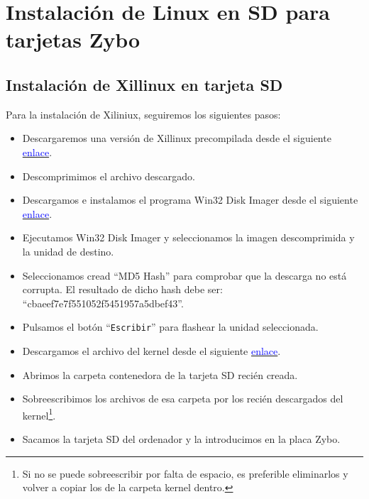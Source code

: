 \section{Instalación de Linux en SD para tarjetas Zybo}
\subsection{Instalación de Xillinux en tarjeta SD}
Para la instalación de Xiliniux, seguiremos los siguientes pasos:
\begin{itemize}
	\item Descargaremos una versión de Xillinux precompilada desde el siguiente \href{https://www.dropbox.com/s/9qgcoyjzoi764f0/2016.02.02.debian-cbaeef7e7f551052f5451957a5dbef43.zip?dl=0}{\textcolor{blue}{enlace}}.
	\item Descomprimimos el archivo descargado.
	\item Descargamos e instalamos el programa Win32 Disk Imager desde el siguiente \href{https://dw.uptodown.com/dwn/w76tVn7onjw1uZFTLSx7oG5vt1Y7gsfE_vPZCAa88I4YqL5Lp6S__CQhpJZGOLPYdjr73a4yGULPiRxv8Z2IsSRQjRPewPceg1Ol2gDzH3IkO3MHOCcuKQCNZwYI9Pvt/8_NYEhYYhGoJ_QXK-PQtvMDn5aHkqiWxwMofLuT2S5SxxDw2zu6f1OMCW0kqLnB0PGf-zrvou_F_nzjB4fn6Nuvp3WZcVrkFzGgNrhVLInDUMHPM0Jfxh76lJU_IATF7/9xrSlUN8npqZOVysN4LIc5iQnXIPmWNSWKNBLv7hcuQxXmyjX8qERxO48SnXIgr83mVVF-bcUsWJGGryhVqZ_LiBsoZmxxEyZE5JXoqVhCI=/}{\textcolor{blue}{enlace}}.
	\item Ejecutamos Win32 Disk Imager y seleccionamos la imagen descomprimida y la unidad de destino.
	\item Seleccionamos cread ``MD5 Hash'' para comprobar que la descarga no está corrupta. El resultado de dicho hash debe ser: ``cbaeef7e7f551052f5451957a5dbef43''.
	\item Pulsamos el botón ``\texttt{Escribir}'' para flashear la unidad seleccionada.
	\item Descargamos el archivo del kernel desde el siguiente \href{https://uc405c43ce82f6c3032b21ba76bf.dl.dropboxusercontent.com/cd/0/get/AehqJhpiTxZ90sAdGxOFqHxr04BAsug_4RaV6MPX5yBDOQBVaIpDw11X6LdVBi7DPsndN7IxeWYRcEmUAt4xnKoIeYJBRtYu4JtZ_M71as8xbw/file?_download_id=621489597300519201006251662619095482850364296264714456845096204891&_notify_domain=www.dropbox.com&dl=1}{\textcolor{blue}{enlace}}.
	\item Abrimos la carpeta contenedora de la tarjeta SD recién creada.
	\item Sobreescribimos los archivos de esa carpeta por los recién descargados del kernel\footnote{Si no se puede sobreescribir por falta de espacio, es preferible eliminarlos y volver a copiar los de la carpeta kernel dentro.}.
	\item Sacamos la tarjeta SD del ordenador y la introducimos en la placa Zybo.
\end{itemize}


